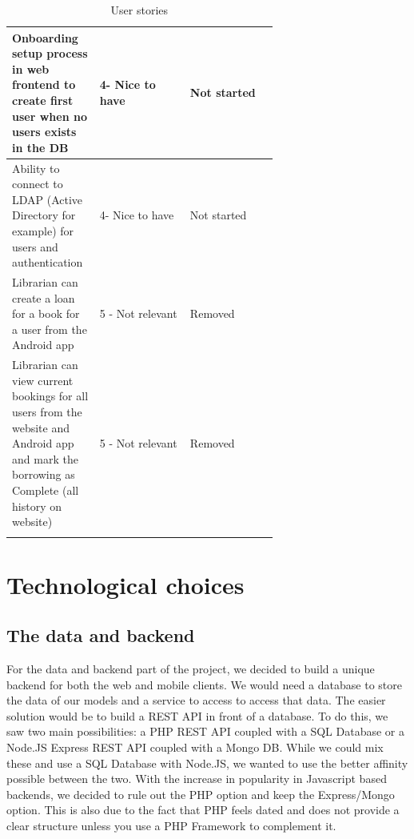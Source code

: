 \documentclass[11pt,a4paper]{report}
\begin{document}
\begin{longtable}[c]{|p{0.33\linewidth}|l|p{0.33\linewidth}|}
Onboarding setup process in web frontend to create first user when no users exists in the DB                                                   & 4- Nice to have   & Not started                                      \\ \hline
Ability to connect to LDAP (Active Directory for example) for users and authentication                                                         & 4- Nice to have   & Not started                                      \\ \hline
Librarian can create a loan for a book for a user from the Android app                                                                         & 5 - Not relevant  & Removed                                          \\ \hline
Librarian can view current bookings for all users from the website and Android app and mark the borrowing as Complete (all history on website) & 5 - Not relevant  & Removed                                          \\ \hline
\caption{User stories}
\label{user_stories_table}\\
\end{longtable}


\section{Technological choices}
\label{technological choices}
\subsection{The data and backend}
For the data and backend part of the project, we decided to build a unique backend for both the web and mobile clients. We would need a database to store the data of our models and a service to access to access that data. The easier solution would be to build a REST API in front of a database. To do this, we saw two main possibilities: a PHP REST API coupled with a SQL Database or a Node.JS Express REST API coupled with a Mongo DB. While we could mix these and use a SQL Database with Node.JS, we wanted to use the better affinity possible between the two. With the increase in popularity in Javascript based backends, we decided to rule out the PHP option and keep the Express/Mongo option. This is also due to the fact that PHP feels dated and does not provide a clear structure unless you use a PHP Framework to complement it. \\
\end{document}

